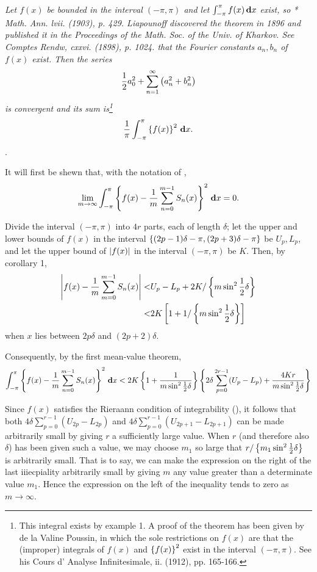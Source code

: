 %
\emph{Let $f(x)$ be bounded in the interval $(-\pi, \pi)$ and let
$\int_{-\pi}^{\pi} f(x) \, \mathbf{d} x$ exist, so
* Math. Ann. lvii. (1903), p. 429. Liapounoff discovered the theorem
in 1896 and published it in the Proceedings of the Math. Soc. of the
Univ. of Kharkov. See Comptes Rendw, cxxvi. (1898), p. 1024.
%
%
that the Fourier constants $a_{n}, b_{n}$ of $f(x)$ exist. Then the series
$$
\frac{1}{2} a_{0}^{2}
+
\sum_{n=1}^{\infty} \left( 
  a_{n}^{2} + b_{n}^{2}
 \right)
$$
is convergent and its sum is\footnote{This integral exists by
   example 1. %
  A proof of the theorem has been given by de la Valine Poussin, %
  in which the sole restrictions on $f(x)$ are that the (improper) integrals of
  $f(x)$ and $\left\{ f(x) \right\}^{2}$ exist in the interval $(-\pi, \pi)$. See his
  Cours d' Analyse Infinitesimale, ii. (1912), pp. 165-166.}
$$
\frac{1}{\pi}
\int_{-\pi}^{\pi}
\left\{ 
  f(x)
 \right\}^{2}
\, \mathbf{d} x.
$$}.

It will first be shewn that, with the notation of ,
$$
\lim_{m \rightarrow \infty}
\int_{-\pi}^{\pi}
\left\{ 
  f(x)
  -
  \frac{1}{m}
  \sum_{n=0}^{m-1}
  S_{n}(x)
 \right\}^{2}
\, \mathbf{d} x
=
0.
$$

Divide the interval $(-\pi, \pi)$ into $4r$ parts, each of length $\delta$;
let the upper and lower bounds of $f(x)$ in the interval
$\left\{ (2p-1)\delta - \pi, (2p+3)\delta - \pi \right\}$
be $U_{p}, L_{p}$, and let the upper bound of $\left| f(x) \right|$ in the
interval $(-\pi, \pi)$ be $K$. Then, by
 corollary 1, %
\begin{align*}
  \left| 
    f(x)
    -
    \frac{1}{m}
    \sum_{m=0}^{m-1} S_{n}(x)
   \right|
  <&
  U_{p} - L_{p} + 2K / \left\{ m \sin^{2} \frac{1}{2}\delta \right\}
  \\
  <&
  2K \left[ 
    1 + 1/\left\{ m \sin^{2} \frac{1}{2}\delta \right\}
   \right]
\end{align*}
when $x$ lies between $2p\delta$ and $(2p+2)\delta$.

Consequently, by the first mean-value theorem,
$$
\int_{-\pi}^{\pi}
\left\{ 
  f(x)
  -
  \frac{1}{m}
  \sum_{n=0}^{m-1} S_{n}(x)
 \right\}^{2}
\, \mathbf{d} x
<
2K
\left\{ 
  1
  +
  \frac{1}{m \sin^{2} \frac{1}{2}\delta}
 \right\}
\left\{ 
  2\delta
  \sum_{p=0}^{2r-1}
  (U_{p}-L_{p})
  +
  \frac{4Kr}{m \sin^{2} \frac{1}{2} \delta}
 \right\}
$$

Since $f(x)$ satisfies the Rieraann condition of integrability
(), it follows that both
$4\delta \sum_{p=0}^{r-1} (U_{2p}-L_{2p})$
and
$4\delta \sum_{p=0}^{r-1} (U_{2p+1}-L_{2p+1})$ can be made arbitrarily
small by giving $r$ a sufficiently large value.
When $r$ (and therefore also $\delta$) has been given
such a value, we may choose $m_{1}$ so large that
$r / \left\{ m_{1} \sin^{2} \frac{1}{2}\delta \right\}$ is
arbitrarily small. That is to say, we can make the expression on the
right of the last iiiecpiality arbitrarily small by giving $m$ any value
greater than a determinate value $m_{1}$. Hence the expression on the left
of the inequality tends to zero as $m \rightarrow \infty$.

